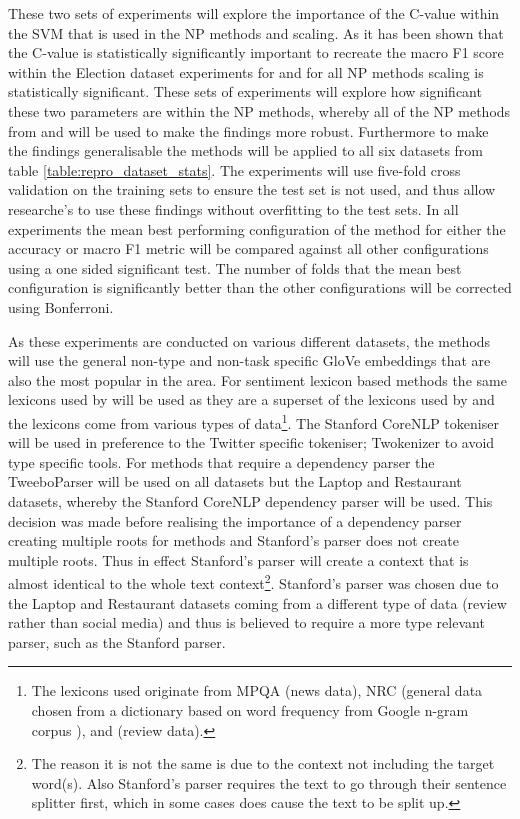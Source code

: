 These two sets of experiments will explore the importance of the C-value within the SVM that is used in the NP methods and scaling. As it has been shown that the C-value is statistically significantly important to recreate the macro F1 score within the Election dataset experiments for \citet{wang-etal-2017-tdparse} and for all NP methods scaling is statistically significant. These sets of experiments will explore how significant these two parameters are within the NP methods, whereby all of the NP methods from \citet{vo2015target} and \citet{wang-etal-2017-tdparse} will be used to make the findings more robust. Furthermore to make the findings generalisable the methods will be applied to all six datasets from table \ref{table:repro_dataset_stats}. The experiments will use five-fold cross validation on the training sets to ensure the test set is not used, and thus allow researche's to use these findings without overfitting to the test sets. In all experiments the mean best performing configuration of the method for either the accuracy or macro F1 metric will be compared against all other configurations using a one sided significant test. The number of folds that the mean best configuration is significantly better than the other configurations will be corrected using Bonferroni. 

As these experiments are conducted on various different datasets, the methods will use the general non-type and non-task specific GloVe embeddings that are also the most popular in the area. For sentiment lexicon based methods the same lexicons used by \citet{wang-etal-2017-tdparse} will be used as they are a superset of the lexicons used by \citet{vo2015target} and the lexicons come from various types of data\footnote{The lexicons used originate from MPQA \citep{wilson-etal-2005-recognizing} (news data), NRC \citep{mohammad-turney-2010-emotions} (general data chosen from a dictionary based on word frequency from Google n-gram corpus \citep{brantsweb}), and \citet{hu2004mining} (review data).}. The Stanford CoreNLP tokeniser \citep{manning-etal-2014-stanford} will be used in preference to the Twitter specific tokeniser; Twokenizer \citep{gimpel-etal-2011-part} to avoid type specific tools. For \citet{wang-etal-2017-tdparse} methods that require a dependency parser the TweeboParser \citep{kong-etal-2014-dependency} will be used on all datasets but the Laptop and Restaurant datasets, whereby the Stanford CoreNLP dependency parser will be used. This decision was made before realising the importance of a dependency parser creating multiple roots for \citet{wang-etal-2017-tdparse} methods and Stanford's parser does not create multiple roots. Thus in effect Stanford's parser will create a context that is almost identical to the whole text context\footnote{The reason it is not the same is due to the context not including the target word(s). Also Stanford's parser requires the text to go through their sentence splitter first, which in some cases does cause the text to be split up.}. Stanford's parser was chosen due to the Laptop and Restaurant datasets coming from a different type of data (review rather than social media) and thus is believed to require a more type relevant parser, such as the Stanford parser. 

